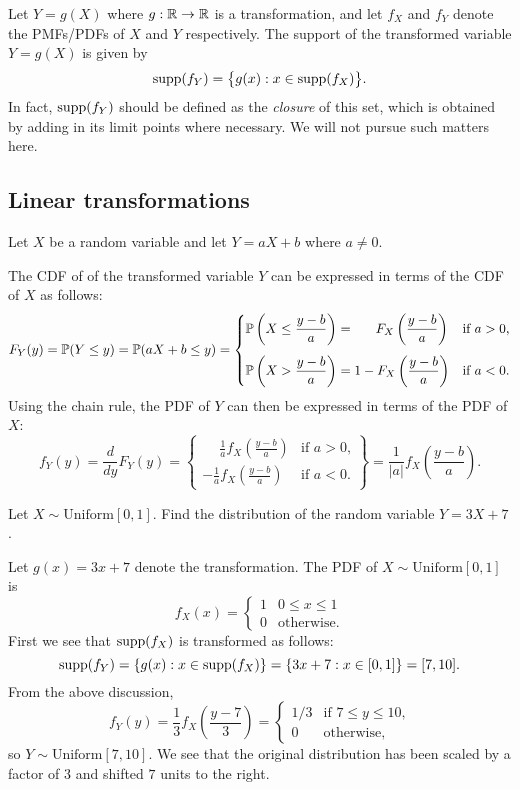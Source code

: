 Let $Y = g(X)$ where $g:\mathbb{R}\to\mathbb{R}$ is a transformation, and let $f_X$ and $f_Y$ denote the PMFs/PDFs of $X$ and $Y$ respectively. The support of the transformed variable $Y = g(X)$ is given by
\[
\text{supp}(f_Y) = \big\{g(x) : x\in\text{supp}(f_X)\big\}.
\]
In fact, $\text{supp}(f_Y)$ should be defined as the \emph{closure} of this set, which is obtained by adding in its limit points where necessary. We will not pursue such matters here.

\subsection{Linear transformations}

Let $X$ be a random variable and let $Y = aX + b$ where $a\neq 0$. 

The CDF of of the transformed variable $Y$ can be expressed in terms of the CDF of $X$ as follows:
\[
F_Y(y) 
	= \mathbb{P}(Y\leq y) 
	= \mathbb{P}(aX+b\leq y)
	= \begin{cases}
		\displaystyle\mathbb{P}\left(X\leq\frac{y-b}{a}\right) = \phantom{1 -\ } F_X\left(\frac{y-b}{a}\right)		& \text{if $a>0$,} \\[3ex]
		\displaystyle\mathbb{P}\left(X>\frac{y-b}{a}\right)	 = 1 - F_X\left(\frac{y-b}{a}\right)	& \text{if $a<0$.}
	\end{cases}
\]
Using the chain rule, the PDF of $Y$ can then be expressed in terms of the PDF of $X$:
\smallskip
\[
f_Y(y) = \frac{d}{dy}F_Y(y) = 
	\left\{
	\begin{array}{ll}
		\phantom{-}\displaystyle\frac{1}{a}f_X\left(\frac{y-b}{a}\right)	& \text{if $a>0$,} \\[3ex]
		-\displaystyle\frac{1}{a}f_X\left(\frac{y-b}{a}\right)				& \text{if $a<0$.}
	\end{array}
	\right\}
	= \frac{1}{|a|}f_X\left(\frac{y-b}{a}\right).
\]
\begin{example}
Let $X\sim\text{Uniform}[0,1]$. Find the distribution of the random variable $Y = 3X + 7$.
\begin{solution}
Let $g(x) = 3x+7$ denote the transformation. The PDF of $X\sim\text{Uniform}[0,1]$ is
\[
f_X(x) = \begin{cases}
	1	& 0\leq x\leq 1 \\
	0	& \text{otherwise.}
\end{cases}
\]
First we see that $\text{supp}(f_X)$ is transformed as follows:
\[
\text{supp}(f_Y) = \{g(x) : x\in\text{supp}(f_X)\} = \{3x+7 : x\in [0,1]\} = [7,10].
\]
From the above discussion,
\[
f_Y(y) = \displaystyle\frac{1}{3}f_X\left(\frac{y-7}{3}\right) 
	= \begin{cases}
		1/3	& \text{if $7\leq y\leq 10$,} \\
		0	& \text{otherwise,}
	\end{cases}
\]
so $Y\sim\text{Uniform}[7,10]$. We see that the original distribution has been scaled by a factor of $3$ and shifted $7$ units to the right.
\end{solution}
\end{example}

